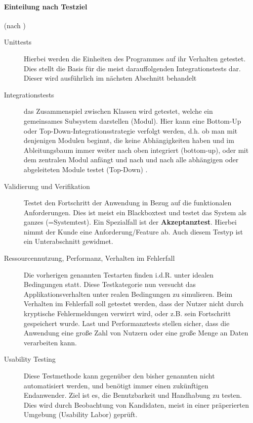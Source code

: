 \paragraph{Einteilung nach Testziel} (nach \citep[S. 238ff]{hunt_pragmatic_1999})
\begin{description}
 \item[Unittests] Hierbei werden die Einheiten des Programmes auf ihr Verhalten getestet. Dies stellt die Basis für die meist darauffolgenden Integrationstests dar. Dieser wird ausführlich im nächsten Abschnitt behandelt
 \item[Integrationstests]  das Zusammenspiel zwischen Klassen wird getestet, welche ein gemeinsames Subsystem darstellen (Modul). Hier kann eine Bottom-Up oder Top-Down\hyp{}Integrationsstrategie verfolgt werden, d.h. ob man mit denjenigen Modulen beginnt, die keine Abhängigkeiten haben und im Ableitungsbaum immer weiter nach oben integriert (bottom-up), oder mit dem zentralen Modul anfängt und nach und nach alle abhängigen oder abgeleiteten Module testet (Top-Down) \citep{liggesmeyer_modultest_1990}.
 \item[Validierung und Verifikation] Testet den Fortschritt der Anwendung in Bezug auf die funktionalen Anforderungen. Dies ist meist ein Blackboxtest und testet das System als ganzes (=Systemtest). Ein Spezialfall ist der \textbf{Akzeptanztest}. Hierbei nimmt der Kunde eine Anforderung/Feature ab. Auch diesem Testyp ist ein Unterabschnitt gewidmet.
 \item[Ressourcennutzung, Performanz, Verhalten im Fehlerfall] Die vorherigen genannten Testarten finden i.d.R. unter idealen Bedingungen statt. Diese Testkategorie nun versucht das Applikationsverhalten unter realen Bedingungen zu simulieren. Beim Verhalten im Fehlerfall soll getestet werden, dass der Nutzer nicht durch kryptische Fehlermeldungen verwirrt wird, oder z.B. sein Fortschritt gespeichert wurde. Last und Performanztests stellen sicher, dass die Anwendung eine große Zahl von Nutzern oder eine große Menge an Daten verarbeiten kann.
 \item[Usability Testing] Diese Testmethode kann gegenüber den bisher genannten nicht automatisiert werden, und benötigt immer einen zukünftigen Endanwender. Ziel ist es, die Benutzbarkeit und Handhabung zu testen. Dies wird durch Beobachtung von Kandidaten, meist in einer präperierten Umgebung (Usability Labor) geprüft.
\end{description}

